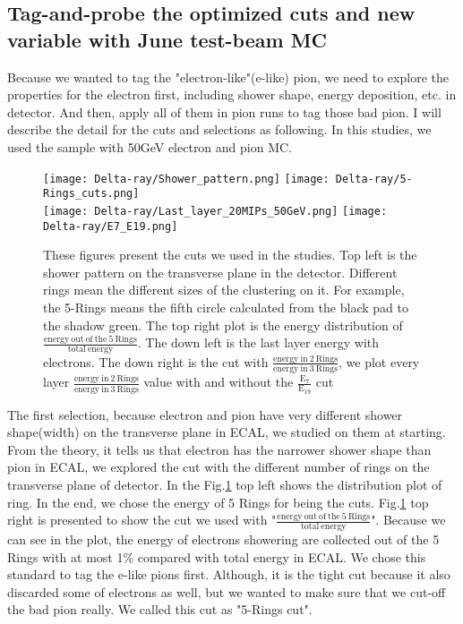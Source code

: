 \documentclass[12pt,twoside,a4paper,an,final]{cms-tdr}
\begin{document}
\subsection{Tag-and-probe the optimized cuts and new variable with June test-beam MC}
Because we wanted to tag the "electron-like"(e-like) pion, we need to explore the properties for the electron first, including shower shape, energy deposition, etc. in detector. And then, apply all of them in pion runs to tag those bad pion. I will describe the detail for the cuts and selections as following. In this studies, we used the sample with 50GeV electron and pion MC.

\begin{figure}[!htb]
\centering
     \texttt{[image: Delta-ray/Shower\_pattern.png]}
     \texttt{[image: Delta-ray/5-Rings\_cuts.png]}\\
     \texttt{[image: Delta-ray/Last\_layer\_20MIPs\_50GeV.png]}
     \texttt{[image: Delta-ray/E7\_E19.png]}
\caption{These figures present the cuts we used in the studies. Top left is the shower pattern on the transverse plane in the detector. Different rings mean the different sizes of the clustering on it. For example, the 5-Rings means the fifth circle calculated from the black pad to the shadow green. The top right plot is the energy distribution of $\frac{\mathrm{energy \ out \ of \ the \ 5 \ Rings}}{\mathrm{total \ energy}}$. The down left is the last layer energy with electrons. The down right is the cut with $\frac{\mathrm{energy \ in \ 2 \ Rings}}{\mathrm{energy \ in \ 3 \ Rings}}$, we plot every layer $\frac{\mathrm{energy \ in \ 2 \ Rings}}{\mathrm{energy \ in \ 3 \ Rings}}$ value with and without the $\frac{\mathrm{E_{7}}}{\mathrm{E_{19}}}$ cut}
\label{cuts_1}
\end{figure}

The first selection, because electron and pion have very different shower shape(width) on the transverse plane in ECAL, we studied on them at starting. From the theory, it tells us that electron has the narrower shower shape than pion in ECAL, we explored the cut with the different number of rings on the transverse plane of detector. In the Fig.\ref{cuts_1} top left shows the distribution plot of ring. In the end, we chose the energy of 5 Rings for being the cuts. Fig.\ref{cuts_1} top right is presented to show the cut we used with "$\frac{\mathrm{energy \ out \ of \ the \ 5 \ Rings}}{\mathrm{total \ energy}}$". Because we can see in the plot, the energy of electrons showering are collected out of the 5 Rings with at most 1\% compared with total energy in ECAL.  We chose this standard to tag the e-like pions first. Although, it is the tight cut because it also discarded some of electrons as well, but we wanted to make sure that we cut-off the bad pion really. We called this cut as "5-Rings cut".
\end{document}
